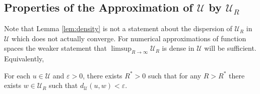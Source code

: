 \documentclass{llncs}
\begin{document}
\subsection{Properties of the Approximation of $\mathcal{U}$ by $\mathcal{U}_{R}$ \label{sec:discretization}}


Note that Lemma \ref{lem:density} is not a statement about the dispersion of $\mathcal{U}_R$ in $\mathcal{U}$ which does not actually converge. For numerical approximations of function spaces the weaker statement that $\limsup_{R\rightarrow \infty}\mathcal{U}_R$ is dense in $\mathcal{U}$ will be sufficient. Equivalently,
%
\begin{lemma}
\label{lem:density}For each $u\in\mathcal{U}$ and $\varepsilon>0$,
there exists $R^{*}>0$ such that for any $R>R^{*}$ there exists
$w\in\mathcal{U}_{R}$ such that $d_{\mathcal{U}}(u,w)<\varepsilon$.\end{lemma}
\end{document}
